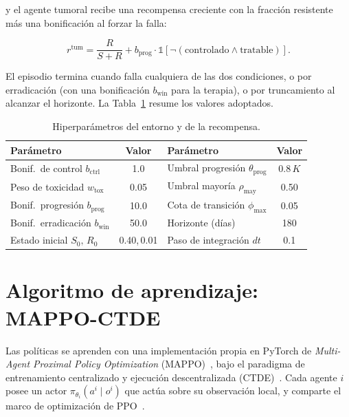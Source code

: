 y el agente tumoral recibe una recompensa creciente con la fracción resistente más una bonificación al forzar la falla:

\begin{equation}
  r^{\text{tum}} = \frac{R}{S+R} + b_{\text{prog}}\cdot \mathbb{1}[\neg(\text{controlado} \wedge \text{tratable})]. \label{eq:reward-tum}
\end{equation}

El episodio termina cuando falla cualquiera de las dos condiciones, o por erradicación (con una bonificación $b_{\text{win}}$ para la terapia), o por truncamiento al alcanzar el horizonte. La Tabla~\ref{tab:hiperparametros-env} resume los valores adoptados.

\begin{table}[H]
\centering
\caption{Hiperparámetros del entorno y de la recompensa.}
\label{tab:hiperparametros-env}
\renewcommand{\arraystretch}{1.2}
\begin{tabular}{l|c||l|c}
\textbf{Parámetro} & \textbf{Valor} & \textbf{Parámetro} & \textbf{Valor} \\
\hline
Bonif.\ de control $b_{\text{ctrl}}$       & 1.0  & Umbral progresión $\theta_{\text{prog}}$ & $0.8\,K$ \\
Peso de toxicidad $w_{\text{tox}}$         & 0.05 & Umbral mayoría $\rho_{\text{may}}$        & 0.50 \\
Bonif.\ progresión $b_{\text{prog}}$       & 10.0 & Cota de transición $\phi_{\max}$          & 0.05 \\
Bonif.\ erradicación $b_{\text{win}}$      & 50.0 & Horizonte (días)                          & 180 \\
Estado inicial $S_0,\,R_0$                 & 0.40,\,0.01 & Paso de integración $dt$           & 0.1 \\
\end{tabular}
\end{table}

\section{Algoritmo de aprendizaje: MAPPO-CTDE}
\label{sec:algoritmo}

Las políticas se aprenden con una implementación propia en PyTorch de \emph{Multi-Agent Proximal Policy Optimization} (MAPPO)~\cite{Yu2022}, bajo el paradigma de entrenamiento centralizado y ejecución descentralizada (CTDE)~\cite{Amato2024}. Cada agente $i$ posee un actor $\pi_{\theta_i}(a^i \mid o^i)$ que actúa sobre su observación local, y comparte el marco de optimización de PPO~\cite{Schulman2017}.

